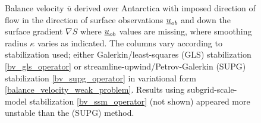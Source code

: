 \begin{figure}
  \caption[Antarctica balance-velocity with $\mathbf{d}^{\text{data}} = -\nabla S$ where $\mathbf{u}_{ob}$ are missing.]{Balance velocity $\bar{u}$ derived over Antarctica with imposed direction of flow in the direction of surface observations $\underline{u}_{ob}$ and down the surface gradient $\nabla S$ where $\underline{u}_{ob}$ values are missing, where smoothing radius $\kappa$ varies as indicated.  The columns vary according to stabilization used; either Galerkin/least-squares (GLS) stabilization \cref{bv_gls_operator} or streamline-upwind/Petrov-Galerkin (SUPG) stabilization \cref{bv_supg_operator} in variational form \cref{balance_velocity_weak_problem}.  Results using subgrid-scale-model stabilization \cref{bv_ssm_operator} (not shown) appeared more unstable than the (SUPG) method. \newline}
  
  \label{antarctica_bv_image_d_gS_m_U}
  
\end{figure}


